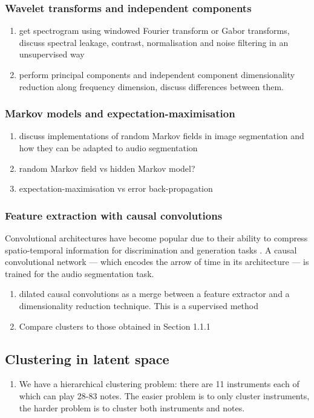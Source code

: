 \documentclass{article}[12pt]
\numberwithin{equation}{section}
\begin{document}
\subsubsection{Wavelet transforms and independent components}
\begin{enumerate}
	\item get spectrogram using windowed Fourier transform or Gabor transforms,
	discuss spectral leakage, contrast, normalisation and noise filtering in an
	unsupervised way
	\item perform principal components and independent component dimensionality
	reduction along frequency dimension, discuss differences between them.
\end{enumerate}
\subsubsection{Markov models and expectation-maximisation}
\begin{enumerate}
	\item discuss implementations of random Markov fields in image segmentation
	and how they can be adapted to audio segmentation
	\item random Markov field vs hidden Markov model?
	\item expectation-maximisation vs error back-propagation
\end{enumerate}
\subsubsection{Feature extraction with causal convolutions}
Convolutional architectures have become popular due to their ability to compress spatio-temporal
information for discrimination and generation tasks \cite{Oord2016a,Goodfellow}.
A causal convolutional network \cite{Oord2016} --- which encodes the arrow of time in
its architecture --- is trained for the audio segmentation task.
\begin{enumerate}
	\item dilated causal convolutions as a merge between a feature
	extractor and a dimensionality reduction technique. This is a supervised method
	\item Compare clusters to those obtained in Section 1.1.1
\end{enumerate}
\subsection{Clustering in latent space}
\begin{enumerate}
	\item We have a hierarchical clustering problem: there are 11 instruments each
	of which can play 28-83 notes. The easier problem is to only cluster instruments,
	the harder problem is to cluster both instruments and notes.
\end{enumerate}
\end{document}
